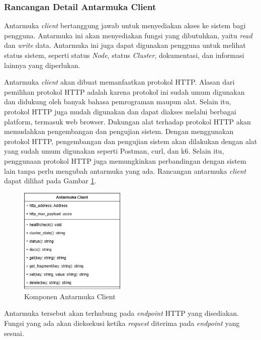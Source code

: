 \subsubsection{Rancangan Detail Antarmuka Client}
\label{subsubsection:detail-client-interface}

Antarmuka \textit{client} bertanggung jawab untuk menyediakan akses ke sistem bagi pengguna. Antarmuka ini akan menyediakan fungsi yang dibutuhkan, yaitu \textit{read} dan \textit{write} data. Antarmuka ini juga dapat digunakan pengguna untuk melihat status sistem, seperti status \textit{Node}, status \textit{Cluster}, dokumentasi, dan informasi lainnya yang diperlukan.

Antarmuka \textit{client} akan dibuat memanfaatkan protokol HTTP. Alasan dari pemilihan protokol HTTP adalah karena protokol ini sudah umum digunakan dan didukung oleh banyak bahasa pemrograman maupun alat. Selain itu, protokol HTTP juga mudah digunakan dan dapat diakses melalui berbagai platform, termasuk web browser. Dukungan alat terhadap protokol HTTP akan memudahkan pengembangan dan pengujian sistem. Dengan menggunakan protokol HTTP, pengembangan dan pengujian sistem akan dilakukan dengan alat yang sudah umum digunakan seperti Postman, curl, dan k6. Selain itu, penggunaan protokol HTTP juga memungkinkan perbandingan dengan sistem lain tanpa perlu mengubah antarmuka yang ada. Rancangan antarmuka \textit{client} dapat dilihat pada Gambar \ref{fig:client-interface-component}.

\begin{figure}[ht]
	\centering
	\includegraphics[width=0.45\textwidth]{resources/chapter-3/client-interface-component.png}
	\caption{Komponen Antarmuka Client}
	\label{fig:client-interface-component}
\end{figure}

Antarmuka tersebut akan terhubung pada \textit{endpoint} HTTP yang disediakan. Fungsi yang ada akan dieksekusi ketika \textit{request} diterima pada \textit{endpoint} yang sesuai.